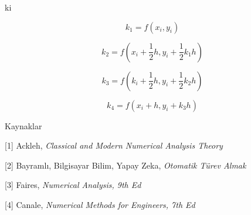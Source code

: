 \documentclass[12pt,fleqn]{article}\usepackage{../../common}
\begin{document}
ki

$$
k_1 = f(x_i,y_i)
$$

$$
k_2 = f \left( x_i + \frac{1}{2}h, y_i + \frac{1}{2}k_1 h  \right)
$$

$$
k_3 = f \left( k_i + \frac{1}{2}h, y_i + \frac{1}{2}k_2 h  \right)
$$

$$
k_4 = f(x_i+h, y_i + k_3 h)
$$

Kaynaklar

[1] Ackleh, {\em Classical and Modern Numerical Analysis Theory}

[2] Bayramlı, Bilgisayar Bilim, Yapay Zeka, {\em Otomatik Türev Almak}

[3] Faires, {\em Numerical Analysis, 9th Ed}

[4] Canale, {\em Numerical Methods for Engineers, 7th Ed}
\end{document}
